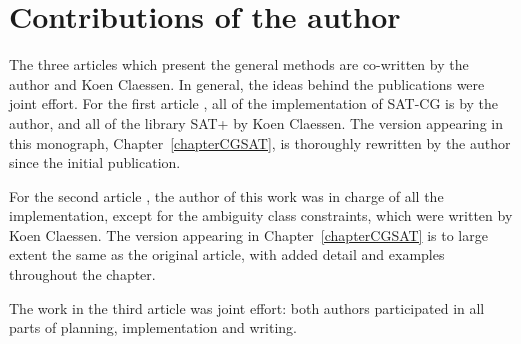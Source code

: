 \section{Contributions of the author}

The three articles which present the general methods \cite{listenmaa_claessen2015,listenmaa_claessen2016,listenmaa_claessen2018} are co-written by the author and Koen Claessen.
In general, the ideas behind the publications were joint effort.
For the first article \cite{listenmaa_claessen2015}, all of the implementation of SAT-CG is by the author,
and all of the library SAT+ by Koen Claessen.
The version appearing in this monograph, Chapter~\ref{chapterCGSAT}, is thoroughly rewritten by the author since the initial publication.

For the second article \cite{listenmaa_claessen2016}, the author of this work was in charge of all the implementation, except for the ambiguity class constraints, which were written by Koen Claessen. 
The version appearing in Chapter~\ref{chapterCGSAT} is to large extent the same as the original article, with added detail and examples throughout the chapter.

The work in the third article \cite{listenmaa_claessen2018} was joint effort: both authors participated in all parts of planning, implementation and writing.


